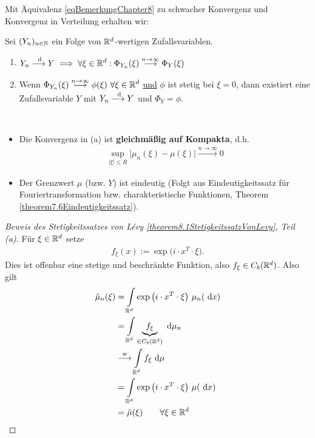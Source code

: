 Mit Äquivalenz \eqref{eqBemerkungChapter8} zu schwacher Konvergenz und Konvergenz in Verteilung erhalten wir:

\begin{korollar}\label{korollar8.2}
	Sei $(Y_n)_{n\in\mathbb{N}}$ ein Folge von $\mathbb{R}^d$-wertigen Zufallsvariablen.
	\begin{enumerate}[label=(\alph*)]
		\item $\begin{aligned}
			Y_n\overset{\text{ d}}{\longrightarrow} Y\implies\forall\xi\in\mathbb{R}^d:\Phi_{Y_n}(\xi)\overset{n\to\infty}{\longrightarrow}\Phi_Y(\xi)
		\end{aligned}$
		\item Wenn $\begin{aligned}
			 \Phi_{Y_n}(\xi)\overset{n\to\infty}{\longrightarrow}\phi(\xi)~\forall\xi\in\mathbb{R}^d
		\end{aligned}$
		\underline{und} $\phi$ ist stetig bei $\xi=0$, dann existiert eine Zufallsvariable $Y$ mit $Y_n\overset{\text{ d}}{\longrightarrow}Y$ und $\Phi_Y=\phi$.
	\end{enumerate}
\end{korollar}

\begin{bemerkung}\
	\begin{itemize}
		\item Die Konvergenz in (a) ist \textbf{gleichmäßig auf Kompakta}, d.h.
		\begin{align*}
			\sup\limits_{|\xi|\leq R}\Big|\mu_n(\xi)-\mu(\xi)\Big|\overset{n\to\infty}{\longrightarrow}0
		\end{align*}
		\item Der Grenzwert $\mu$ (bzw. $Y$) ist eindeutig 
		(Folgt aus Eindeutigkeitssatz für Fouriertransformation bzw. charakteristische Funktionen, Theorem \ref{theorem7.6Eindeutigkeitssatz}).
	\end{itemize}
\end{bemerkung}

\begin{proof}[Beweis des Stetigkeitssatzes von Lévy \ref{theorem8.1StetigkeitssatzVonLevy}, Teil (a)]\enter
	Für $\xi\in\mathbb{R}^d$ setze
	\begin{align*}
		f_\xi(x):=\exp\big(i\cdot x^T\cdot\xi\big).
	\end{align*}
	Dies ist offenbar eine stetige und beschränkte Funktion, also $f_\xi\in C_b(\mathbb{R}^d)$.
	Also gilt
	\begin{align*}
		\hat{\mu}_n(\xi)
		&=\int\limits_{\mathbb{R}^d}\exp\big(i\cdot x^T\cdot\xi\big)~\mu_n(\text{ d} x) \\
		&=\int\limits_{\mathbb{R}^d} \underbrace{f_\xi}_{\in C_b(\mathbb{R}^d)}\text{ d}\mu_n \\
		&\overset{\text{w}}{\longrightarrow}
		\int\limits_{\mathbb{R}^d}f_\xi\text{ d}\mu\\
		&=\int\limits_{\mathbb{R}^d}\exp\big(i\cdot x^T\cdot\xi\big)~\mu(\text{ d} x) \\
		&=\hat{\mu}(\xi)
		\qquad\forall\xi\in\mathbb{R}^d
	\end{align*}
\end{proof}

